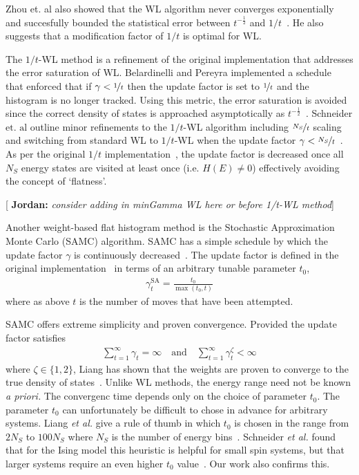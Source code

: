 \documentclass[letterpaper,twocolumn,amsmath,amssymb,pre,aps,10pt]{revtex4-1}
\newcommand{\blue}[1]{{\bf \color{blue} #1}}
\newcommand{\jpsays}[1]{{\color{red} [\blue{Jordan:} \emph{#1}]}}
\begin{document}
Zhou et. al also showed that the WL algorithm never converges
exponentially~\cite{zhou2008optimal} and succesfully bounded the statistical
error between $t^{-\frac12}$ and $1/t$~\cite{zhou2008optimal}. He also suggests
that a modification factor of $1/t$ is optimal for WL.

The $1/t$-WL method is a refinement of the original implementation that
addresses the error saturation of WL. Belardinelli and Pereyra
implemented a schedule~\cite{belardinelli2007fast} that enforced that
if $\gamma < \nicefrac{1}{t}$ then the update factor is set to
$\nicefrac{1}{t}$ and the histogram is no longer tracked. Using this
metric, the error saturation is avoided since the correct density of
states is approached asymptotically as
$t^{-\frac12}$~\cite{belardinelli2008analysis}.
Schneider $\text{et. al}$ outline minor refinements to the $1/t$-WL algorithm
including $\nicefrac{N_S}{t}$ scaling and switching from standard WL to
$1/t$-WL when the update factor $\gamma <
\nicefrac{N_S}{t}$~\cite{schneider2017convergence}. As per the original
$1/t$ implementation~\cite{belardinelli2007fast}, the update factor is
decreased once all $N_S$ energy states are visited at least once (i.e.
$H(E) \neq 0$) effectively avoiding the concept of `flatness'.

\jpsays{consider adding in minGamma WL here or before 1/t-WL method}

Another weight-based flat histogram method is
the Stochastic Approximation Monte Carlo (SAMC) algorithm. SAMC has a simple
schedule by which the update factor $\gamma$ is continuously
decreased~\cite{liang2007stochastic, werlich2015stochastic,
schneider2017convergence}.  The update factor is defined in the
original implementation~\cite{liang2007stochastic} in terms of an
arbitrary tunable parameter $t_0$,
\begin{align}
\gamma_{t}^{\text{SA}} =\frac{t_0}{\max(t_0,t)}
\end{align}
where as above $t$ is the number of moves that have been attempted.

SAMC offers extreme simplicity and proven convergence.
Provided the update factor satisfies
\begin{align}
\sum_{t=1}^\infty \gamma_{t} = \infty \quad\textrm{and}\quad
\sum_{t=1}^\infty \gamma_{t}^\zeta < \infty
\end{align}
where $\zeta \in \{1,2\}$, Liang has shown that the weights are proven
to converge to the true density of states~\cite{liang2006theory,
liang2007stochastic}.  Unlike WL methods, the energy range need not be
known \emph{a priori.}  The convergenc time depends only on the choice of
parameter $t_0$.
The parameter $t_0$ can unfortunately be difficult to chose in advance
for arbitrary systems.
Liang \emph{et al.} give a rule of thumb in
which $t_0$ is chosen in the range from $2N_S$ to $100N_S$ where $N_S$
is the number of energy bins~\cite{liang2007stochastic}.  Schneider
\emph{et al.} found that for the Ising model this heuristic is helpful
for small spin systems, but that larger systems require an even higher
$t_0$ value~\cite{schneider2017convergence}. Our work also confirms this.
\end{document}
